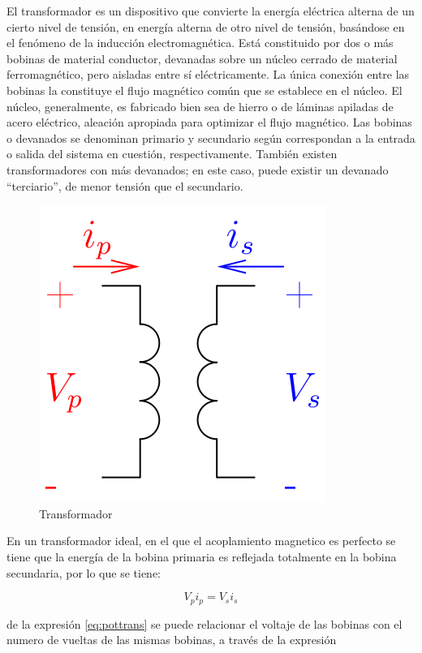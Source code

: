 \documentclass{article}
\begin{document}
El transformador es un dispositivo que convierte la energía eléctrica
alterna de un cierto nivel de tensión, en energía alterna de otro nivel
de tensión, basándose en el fenómeno de la inducción electromagnética.
Está constituido por dos o más bobinas de material conductor, devanadas
sobre un núcleo cerrado de material ferromagnético, pero aisladas entre
sí eléctricamente. La única conexión entre las bobinas la constituye el
flujo magnético común que se establece en el núcleo. El núcleo,
generalmente, es fabricado bien sea de hierro o de láminas apiladas de
acero eléctrico, aleación apropiada para optimizar el flujo magnético.
Las bobinas o devanados se denominan primario y secundario según
correspondan a la entrada o salida del sistema en cuestión,
respectivamente. También existen transformadores con más devanados; en
este caso, puede existir un devanado ``terciario'', de menor tensión que
el secundario.

\begin{figure}[htbp]
\centering
\includegraphics{images/transformador.png}
\caption{Transformador}
\end{figure}

En un transformador ideal, en el que el acoplamiento magnetico es
perfecto se tiene que la energía de la bobina primaria es reflejada
totalmente en la bobina secundaria, por lo que se tiene:

\begin{equation}\label{eq:pottrans}
V_{p}i_{p}=V_{s}i_{s}
\end{equation}

de la expresión \eqref{eq:pottrans} se puede relacionar el voltaje de
las bobinas con el numero de vueltas de las mismas bobinas, a través de
la expresión
\end{document}
